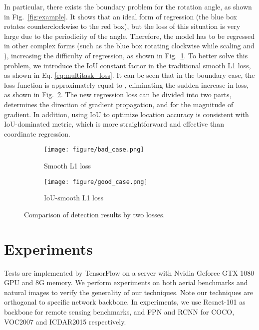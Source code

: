 \documentclass[10pt,twocolumn,letterpaper]{article}
\begin{document}
	In particular, there exists the boundary problem for the rotation angle, as shown in Fig.~\ref{fig:example}. It shows that an ideal form of regression (the blue box rotates counterclockwise to the red box), but the loss of this situation is very large due to the periodicity of the angle. Therefore, the model has to be regressed in other complex forms (such as the blue box rotating clockwise while scaling  and ), increasing the difficulty of regression, as shown in Fig.~\ref{fig:bad_case}. To better solve this problem, we introduce the IoU constant factor  in the traditional smooth L1 loss, as shown in Eq. \ref{eq:multitask_loss}. It can be seen that in the boundary case, the loss function is approximately equal to , eliminating the sudden increase in loss, as shown in Fig.~\ref{fig:good_case}. The new regression loss can be divided into two parts,  determines the direction of gradient propagation, and  for the magnitude of  gradient. In addition, using IoU to optimize location accuracy is consistent with IoU-dominated metric, which is more straightforward and effective than coordinate regression.
	
	\begin{figure}[tb!]
		\centering
		\begin{subfigure}{.23\textwidth}
			\centering
			\texttt{[image: figure/bad\_case.png]}
			\caption{Smooth L1 loss}
			\label{fig:bad_case}
		\end{subfigure}
		\vspace{-3pt}
		\begin{subfigure}{.23\textwidth}
			\centering
			\texttt{[image: figure/good\_case.png]}
			\caption{IoU-smooth L1 loss}
			\label{fig:good_case}
		\end{subfigure}
		\vspace{-10pt}
		\caption{Comparison of detection results by two losses.}
		\label{fig:cases}
	\end{figure}
\section{Experiments}
	Tests are implemented by TensorFlow \cite{abadi2016tensorflow} on a server with Nvidia Geforce GTX 1080 GPU and 8G memory. We perform experiments on both aerial benchmarks and natural images to verify the generality of our techniques. Note our techniques are orthogonal to specific network backbone. In experiments, we use Resnet-101 as backbone for remote sensing benchmarks, and FPN and RCNN for COCO, VOC2007 and ICDAR2015 respectively.
	
\end{document}
